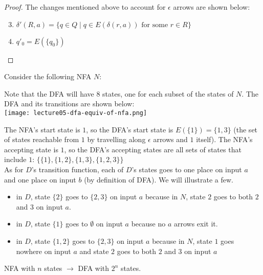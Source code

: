 \documentclass[11pt,a4paper]{article}
\begin{document}
\begin{theorem}
\begin{proof}
        The changes mentioned above to account for $\epsilon$ arrows are shown below:
        \begin{enumerate}
            \setcounter{enumi}{2}
            \item $\delta'(R,a)=\{q\in Q\mid q\in E(\delta(r,a))\text{ for some }r\in R\}$
            \item $q'_0=E(\{q_0\})$
        \end{enumerate}
    \end{proof}
\end{theorem}

\begin{example}
    Consider the following NFA $N$:


    Note that the DFA will have 8 states, one for each subset of the states of $N$. The DFA and its transitions are shown below: \\

    \texttt{[image: lecture05-dfa-equiv-of-nfa.png]}

    The NFA's start state is $1$, so the DFA's start state is $E(\{1\})=\{1,3\}$ (the set of states reachable from $1$ by travelling along $\epsilon$ arrows and $1$ itself).
    The NFA's accepting state is $1$, so the DFA's accepting states are all sets of states that include $1$: $\{\{1\}, \{1,2\},\{1,3\},\{1,2,3\}\}$ \\

    As for $D$'s transition function, each of $D$'s states goes to one place on input $a$ and one place on input $b$ (by definition of DFA). We will illustrate a few.

    \begin{itemize}
        \item in $D$, state $\{2\}$ goes to $\{2,3\}$ on input $a$ because in $N$, state $2$ goes to both $2$ and $3$ on input $a$.
        \item in $D$, state $\{1\}$ goes to $\emptyset$ on input $a$ because no $a$ arrows exit it.
        \item in $D$, state $\{1,2\}$ goes to $\{2,3\}$ on input $a$ because in $N$, state $1$ goes nowhere on input $a$ and state $2$ goes to both $2$ and $3$ on input $a$
    \end{itemize}

    NFA with $n$ states $\rightarrow$ DFA with $2^n$ states.
\end{example}
\end{document}
